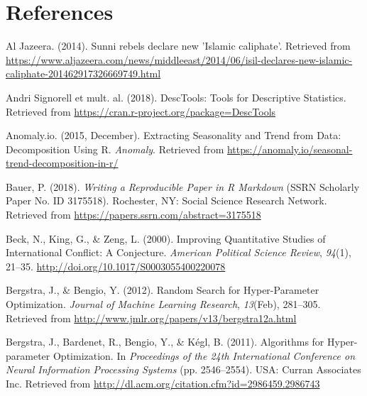 \documentclass[11pt,oneside,a4paper]{reedthesis}
\begin{document}
\chapter*{References}\label{references}


\noindent

\setlength{\parindent}{-0.20in} \setlength{\leftskip}{0.20in}
\setlength{\parskip}{8pt}

\hypertarget{refs}{}
\hypertarget{ref-AlJazeera_2014}{}
Al Jazeera. (2014). Sunni rebels declare new 'Islamic caliphate'.
Retrieved from
\url{https://www.aljazeera.com/news/middleeast/2014/06/isil-declares-new-islamic-caliphate-201462917326669749.html}

\hypertarget{ref-AndriSignorelletmult.al._2018}{}
Andri Signorell et mult. al. (2018). DescTools: Tools for Descriptive
Statistics. Retrieved from
\url{https://cran.r-project.org/package=DescTools}

\hypertarget{ref-Anomaly.io_2015}{}
Anomaly.io. (2015, December). Extracting Seasonality and Trend from
Data: Decomposition Using R. \emph{Anomaly}. Retrieved from
\url{https://anomaly.io/seasonal-trend-decomposition-in-r/}

\hypertarget{ref-Bauer_2018}{}
Bauer, P. (2018). \emph{Writing a Reproducible Paper in R Markdown}
(SSRN Scholarly Paper No. ID 3175518). Rochester, NY: Social Science
Research Network. Retrieved from
\url{https://papers.ssrn.com/abstract=3175518}

\hypertarget{ref-Beck_2000}{}
Beck, N., King, G., \& Zeng, L. (2000). Improving Quantitative Studies
of International Conflict: A Conjecture. \emph{American Political
Science Review}, \emph{94}(1), 21--35.
\url{http://doi.org/10.1017/S0003055400220078}

\hypertarget{ref-Bergstra_2012}{}
Bergstra, J., \& Bengio, Y. (2012). Random Search for Hyper-Parameter
Optimization. \emph{Journal of Machine Learning Research},
\emph{13}(Feb), 281--305. Retrieved from
\url{http://www.jmlr.org/papers/v13/bergstra12a.html}

\hypertarget{ref-Bergstra_2011}{}
Bergstra, J., Bardenet, R., Bengio, Y., \& Kégl, B. (2011). Algorithms
for Hyper-parameter Optimization. In \emph{Proceedings of the 24th
International Conference on Neural Information Processing Systems} (pp.
2546--2554). USA: Curran Associates Inc. Retrieved from
\url{http://dl.acm.org/citation.cfm?id=2986459.2986743}
\end{document}
